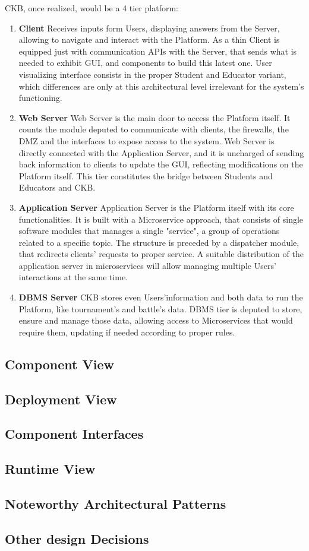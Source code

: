 CKB, once realized, would be a 4 tier platform:
\begin{enumerate}[label=$\bullet$]
    \item \textbf{Client} Receives inputs form Users, displaying answers from the Server, allowing to navigate and interact with the Platform. As a thin Client is equipped just with 
    communication APIs with the Server, that sends what is needed to exhibit GUI, and components to build this latest one. User visualizing interface consists in the proper Student and Educator 
    variant, which differences are only at this architectural level irrelevant for the system's functioning.
    \item \textbf{Web Server} Web Server is the main door to access the Platform itself. It counts the module deputed to communicate with clients, the firewalls, the DMZ and the interfaces to 
    expose access to the system. Web Server is directly connected with the Application Server, and it is uncharged of sending back information to clients to update the GUI, reflecting 
    modifications on the Platform itself. This tier constitutes the bridge between Students and Educators and CKB.
    \item \textbf{Application Server} Application Server is the Platform itself with its core functionalities. It is built with a Microservice approach, that consists of single software modules 
    that manages a single "service", a group of operations related to a specific topic. The structure is preceded by a dispatcher module, that redirects clients' requests to proper service. 
    A suitable distribution of the application server in microservices will allow managing multiple Users' interactions at the same time.
    \item \textbf{DBMS Server} CKB stores even Users'information and both data to run the Platform, like tournament's and battle's data. DBMS tier is deputed to store, ensure and manage those data, 
    allowing access to Microservices that would require them, updating if needed according to proper rules. 
\end{enumerate}



\subsection{Component View}
\subsection{Deployment View}
\subsection{Component Interfaces}
\subsection{Runtime View}
\subsection{Noteworthy Architectural Patterns}
\subsection{Other design Decisions}